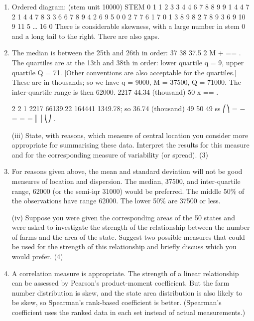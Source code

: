 \documentclass[a4paper,12pt]{article}
\begin{document}
\begin{enumerate} 
\item  Ordered diagram: (stem unit 10000) 
          STEM    0  1 1 2 3 3 4 4 6 7 8 8 9 9    1  4 4 7    2  1 4 4 7 8    3  3 6 6 7 8 9    4  2 6 9    5  0 0 2 7 7    6  1    7  0 1 3 8 9    8  2 7 8    9  3 6 9  10  9  11  5  …   16  0 
 There is considerable skewness, with a large number in stem 0 and a long tail to the right.  There are also gaps. 
\item  The median is between the 25th and 26th in order:  37 38 37.5 2 M + == . 
 The quartiles are at the 13th and 38th in order:  lower quartile q = 9, upper quartile Q = 71.  [Other conventions are also acceptable for the quartiles.] 
 These are in thousands;  so we have q = 9000, M = 37500, Q = 71000.  The inter-quartile range is then 62000. 
  2217 44.34 (thousand) 50 x == . 
 
 
2 2 1 2217 66139.22 164441 1349.78; so 36.74 (thousand) 49 50 49 ss ⎛⎞ = − = = = ⎜⎟ ⎝⎠ . 

\begin{framed}

(iii) State, with reasons, which measure of central location you consider more appropriate for summarising these data.  Interpret the results for this measure and for the corresponding measure of variability (or spread). (3) 
\end{framed} 
\item  For reasons given above, the mean and standard deviation will not be good measures of location and dispersion.  The median, 37500, and inter-quartile range, 62000 (or the semi-iqr 31000) would be preferred. 
 The middle 50\% of the observations have range 62000.  The lower 50\% are 37500 or less. 
 

\begin{framed}

 
(iv) Suppose you were given the corresponding areas of the 50 states and were asked to investigate the strength of the relationship between the number of farms and the area of the state.  Suggest two possible measures that could be used for the strength of this relationship and briefly discuss which you would prefer. (4) 
 
\end{framed} 
\item  A correlation measure is appropriate.  The strength of a linear relationship can be assessed by Pearson's product-moment coefficient.  But the farm number distribution is skew, and the state area distribution is also likely to be skew, so Spearman's rank-based coefficient is better.  (Spearman's coefficient uses the ranked data in each set instead of actual measurements.) 
\end{enumerate}
\end{document}
